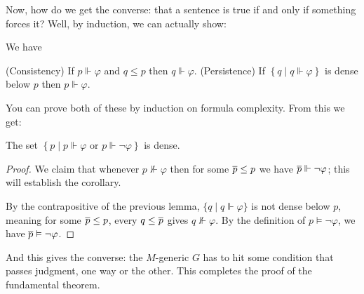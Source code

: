 Now, how do we get the converse: that a sentence is true if and only if something forces it?
Well, by induction, we can actually show:
\begin{lemma}
	We have
	\begin{enumerate}[(1)]
		\ii (Consistency) If $p \Vdash \varphi$ and $q \le p$ then $q \Vdash \varphi$.
		\ii (Persistence) If $\left\{ q \mid q \Vdash \varphi \right\}$
		is dense below $p$ then $p \Vdash \varphi$.
	\end{enumerate}
\end{lemma}
You can prove both of these by induction on formula complexity.
From this we get:
\begin{corollary}[Completeness]
	The set $\left\{ p \mid p \Vdash \varphi \text{ or } p \Vdash \neg\varphi \right\}$
	is dense.
\end{corollary}
\begin{proof}
	We claim that whenever $p \not\Vdash \varphi$ then
	for some $\overline p \le p$ we have $\overline p \Vdash \neg\varphi$;
	this will establish the corollary.

	By the contrapositive of the previous lemma,
	$\{q \mid q \Vdash \varphi\}$ is not dense below $p$,
	meaning for some $\overline p \le p$, every $q \le \overline p$ gives $q \not\Vdash \varphi$.
	By the definition of $p \vDash \neg\varphi$,
	we have $\overline p \vDash \neg\varphi$.
\end{proof}
And this gives the converse: the $M$-generic $G$ has to hit some condition
that passes judgment, one way or the other.
This completes the proof of the fundamental theorem.

